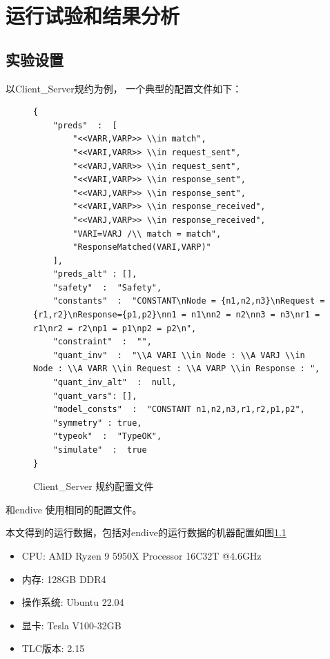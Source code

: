 \chapter{运行试验和结果分析}\label{chap:run-analysis}

\section{实验设置}

以{Client\_Server}规约为例， 一个典型的配置文件如下：
\begin{figure}[htb]
    \centering
\begin{lstlisting}[]
{
    "preds"  :  [
        "<<VARR,VARP>> \\in match",
        "<<VARI,VARR>> \\in request_sent",
        "<<VARJ,VARR>> \\in request_sent",
        "<<VARI,VARP>> \\in response_sent",
        "<<VARJ,VARP>> \\in response_sent",
        "<<VARI,VARP>> \\in response_received",
        "<<VARJ,VARP>> \\in response_received",
        "VARI=VARJ /\\ match = match",
        "ResponseMatched(VARI,VARP)"
    ],
    "preds_alt" : [],
    "safety"  :  "Safety",
    "constants"  :  "CONSTANT\nNode = {n1,n2,n3}\nRequest = {r1,r2}\nResponse={p1,p2}\nn1 = n1\nn2 = n2\nn3 = n3\nr1 = r1\nr2 = r2\np1 = p1\np2 = p2\n",
    "constraint"  :  "",
    "quant_inv"  :  "\\A VARI \\in Node : \\A VARJ \\in Node : \\A VARR \\in Request : \\A VARP \\in Response : ",
    "quant_inv_alt"  :  null,
    "quant_vars": [],
    "model_consts"  :  "CONSTANT n1,n2,n3,r1,r2,p1,p2",
    "symmetry" : true,
    "typeok"  :  "TypeOK",
    "simulate"  :  true      
}
\end{lstlisting}
\caption{Client\_Server 规约配置文件}
\label{lst:config}
\end{figure}

\rltla 和endive 使用相同的配置文件。

本文得到的运行数据，包括对endive的运行数据的机器配置如图\ref{lst:config}
\begin{itemize}
    \item CPU: AMD Ryzen 9 5950X Processor 16C32T @4.6GHz
    \item 内存: 128GB DDR4 
    \item 操作系统: Ubuntu 22.04
    \item 显卡: Tesla V100-32GB
    \item TLC版本: 2.15
\end{itemize}

